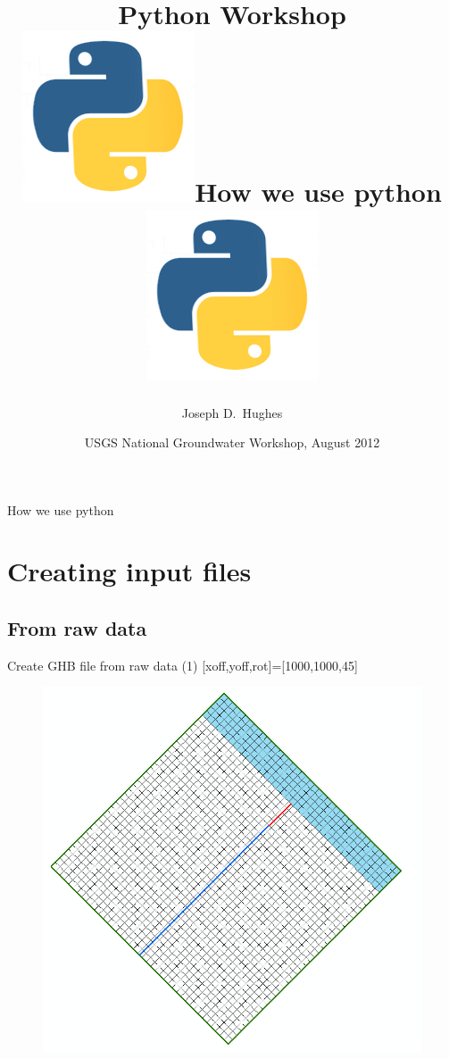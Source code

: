 \documentclass[t]{beamer}
\title[]{Python Workshop\\
 \includegraphics[scale=0.055]{figures/python-app.png}\hspace{5 pt}How we use python\hspace{5 pt}\includegraphics[scale=0.055]{figures/python-app.png} }
\author[Hughes] %
{Joseph D.~Hughes}
\institute[USGS] %
{
  U.S. Geological Survey\\
  Florida Water Science Center, Tampa, Florida USA
  }
\date[UQ12] %
{USGS National Groundwater Workshop, August 2012}
\begin{document}
\begin{frame}
  \titlepage
\end{frame}

\begin{frame}{How we use python}
\tableofcontents
\end{frame}

\section{Creating input files}
\subsection{From raw data}
\begin{frame}{Create GHB file from raw data (1)}
  \tiny{[xoff,yoff,rot]=[1000,1000,45]}
  \begin{figure}[ht]
  \centering
         \includegraphics[height=0.8\textheight]{figures/CoastalModelBoundary.png}
   \end{figure}
\end{frame}
\end{document}

